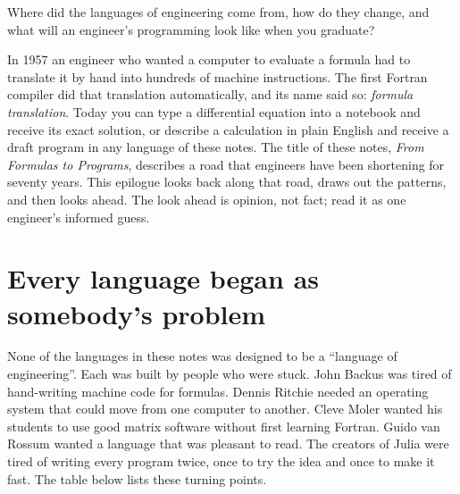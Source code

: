 
\begin{researchquestion}
Where did the languages of engineering come from, how do they change, and what will an
engineer's programming look like when you graduate?
\end{researchquestion}

In 1957 an engineer who wanted a computer to evaluate a formula had to translate it by
hand into hundreds of machine instructions. The first Fortran compiler did that
translation automatically, and its name said so: \emph{formula translation}. Today you can
type a differential equation into a notebook and receive its exact solution, or describe a
calculation in plain English and receive a draft program in any language of these notes.
The title of these notes, \emph{From Formulas to Programs}, describes a road that
engineers have been shortening for seventy years. This epilogue looks back along that
road, draws out the patterns, and then looks ahead. The look ahead is opinion, not fact;
read it as one engineer's informed guess.

\section*{Every language began as somebody's problem}

None of the languages in these notes was designed to be a ``language of engineering''.
Each was built by people who were stuck. John Backus was tired of hand-writing machine
code for formulas. Dennis Ritchie needed an operating system that could move from one
computer to another. Cleve Moler wanted his students to use good matrix software without
first learning Fortran. Guido van Rossum wanted a language that was pleasant to read. The
creators of Julia were tired of writing every program twice, once to try the idea and
once to make it fast. The table below lists these turning points.

